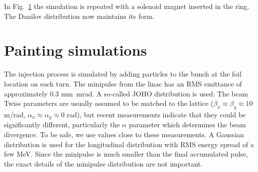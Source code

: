 In Fig.~\ref{} the simulation is repeated with a solenoid magnet inserted in the ring. The Danilov distribution now maintains its form.



\section{Painting simulations}

The injection process is simulated by adding particles to the bunch at the foil location on each turn. The minipulse from the linac has an RMS emittance of approximately 0.3 mm~mrad. A so-called JOHO distribution is used:
%
%
The beam Twiss parameters are usually assumed to be matched to the lattice ($\beta_x \approx \beta_y \approx 10$ m/rad, $\alpha_x \approx \alpha_y \approx 0$ rad), but recent measurements indicate that they could be significantly different, particularly the $\alpha$ parameter which determines the beam divergence. To be safe, we use values close to these measurements. A Gaussian distribution is used for the longitudinal distribution with RMS energy spread of a few MeV. Since the minipulse is much smaller than the final accumulated pulse, the exact details of the minipulse distribution are not important.



